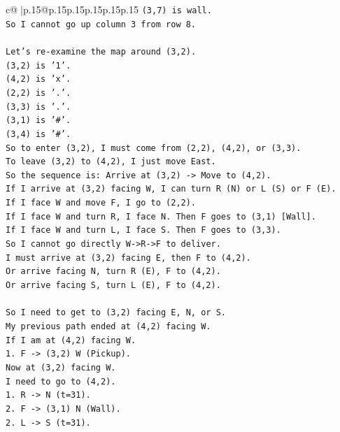 \documentclass{article}
\begin{document}
{\begin{supertabular}{c@{$\;$}|p{.15\linewidth}@{}p{.15\linewidth}p{.15\linewidth}p{.15\linewidth}p{.15\linewidth}p{.15\linewidth}}
{{{\texttt{(3,7) is wall.} \\
\texttt{So I cannot go up column 3 from row 8.} \\
\\ 
\texttt{Let's re{-}examine the map around (3,2).} \\
\texttt{(3,2) is '1'.} \\
\texttt{(4,2) is 'x'.} \\
\texttt{(2,2) is '.'.} \\
\texttt{(3,3) is '.'.} \\
\texttt{(3,1) is '\#'.} \\
\texttt{(3,4) is '\#'.} \\
\texttt{So to enter (3,2), I must come from (2,2), (4,2), or (3,3).} \\
\texttt{To leave (3,2) to (4,2), I just move East.} \\
\texttt{So the sequence is: Arrive at (3,2) {-}> Move to (4,2).} \\
\texttt{If I arrive at (3,2) facing W, I can turn R (N) or L (S) or F (E).} \\
\texttt{If I face W and move F, I go to (2,2).} \\
\texttt{If I face W and turn R, I face N. Then F goes to (3,1) {[}Wall{]}.} \\
\texttt{If I face W and turn L, I face S. Then F goes to (3,3).} \\
\texttt{So I cannot go directly W{-}>R{-}>F to deliver.} \\
\texttt{I must arrive at (3,2) facing E, then F to (4,2).} \\
\texttt{Or arrive facing N, turn R (E), F to (4,2).} \\
\texttt{Or arrive facing S, turn L (E), F to (4,2).} \\
\\ 
\texttt{So I need to get to (3,2) facing E, N, or S.} \\
\texttt{My previous path ended at (4,2) facing W.} \\
\texttt{If I am at (4,2) facing W.} \\
\texttt{1. F {-}> (3,2) W (Pickup).} \\
\texttt{Now at (3,2) facing W.} \\
\texttt{I need to go to (4,2).} \\
\texttt{1. R {-}> N (t=31).} \\
\texttt{2. F {-}> (3,1) N (Wall).} \\
\texttt{2. L {-}> S (t=31).} \\
}}}
\end{supertabular}}
\end{document}
